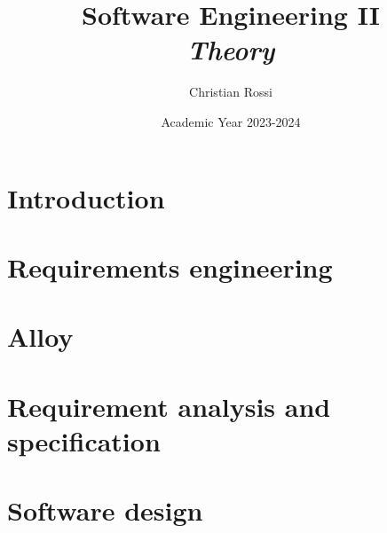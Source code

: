\documentclass[12pt, a4paper]{report}
\title{Software Engineering II \\ \textit{Theory}}
\author{Christian Rossi}
\date{Academic Year 2023-2024}
\begin{document}
    \maketitle

    

    \cleardoublepage
    
    \tableofcontents

    \cleardoublepage

    \chapter{Introduction}
    
    
    
       

    \chapter{Requirements engineering}
    
    
    
      
    
    
    
     
     

    \chapter{Alloy}
    
    
    
    

    \chapter{Requirement analysis and specification}
    

    \chapter{Software design}
    
    
    
    
\end{document}
